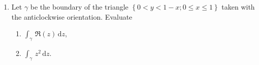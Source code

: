 \documentclass[11pt]{article}
\theoremstyle{definition}
\newenvironment{blockquote}
{\begin{mdframed}[skipabove=0pt, skipbelow=0pt, innertopmargin=4pt, innerbottommargin=4pt, bottomline=false,topline=false,rightline=false, linewidth=2pt]}
{\end{mdframed}}
\newenvironment{soln}{\begin{proof}[Solution]}{\end{proof}}
\begin{document}
\begin{enumerate}[leftmargin=*]
    \begin{soln}
    Let $\gamma$ be a simple closed contour (oriented positively) and let $\Omega$ be an open set containing $\gamma$ as well as its interior. Let $f$ be holomorphic everywhere on $\Omega$. Let $z_0$ be interior to $\gamma$. Now, we define 
    \[
        g(z) \vcentcolon= (z-z_0) \cdot f(z).
    \]
    Since $f$ is holomorphic on $\Omega$, so is $g$. Moreover, $g(z_0) = 0$. Applying the Cauchy Integral Formula to $g$, we have
    \[
        g(z_0) = 0 = \frac{1}{2\pi\iota} \int_{\gamma} \frac{g(z)}{z-z_0} \, \mathrm{d}z = \frac{1}{2\pi\iota} \int_{\gamma} \frac{(z-z_0)\cdot f(z)}{z-z_0} \, \mathrm{d}z
    \]
    Since $z_0$ is interior to $\gamma$, $z - z_0$ is non-zero on all of $\gamma$. Thus, we get
    \[
        \int_{\gamma} f(z) \, \mathrm{d}z = 0,
    \]
    which is what Cauchy's Theorem tells us.
    \end{soln}
    
    \item Let $\gamma$ be the boundary of the triangle $\left\{ 0 < y < 1-x; 0 \leq x \leq 1 \right\}$ taken with the anticlockwise orientation. Evaluate 
    \begin{enumerate}
        \item $\int_{\gamma} \, \mathfrak{R}(z) \, \mathrm{d}z$,
        \item $\int_{\gamma} \, z^2 \, \mathrm{d}z$.
    \end{enumerate}
    
    \begin{center}
	\end{center}
	

\end{enumerate}
\end{document}
